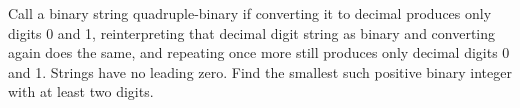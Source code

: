 Call a binary string quadruple-binary if converting it to decimal produces only digits 0 and 1, reinterpreting that decimal digit string as binary and converting again does the same, and repeating once more still produces only decimal digits 0 and 1. Strings have no leading zero. Find the smallest such positive binary integer with at least two digits.
